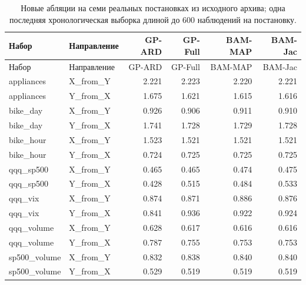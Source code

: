 \begin{longtable}{llrrrr}
\caption{Новые абляции на семи реальных постановках из исходного архива; одна последняя хронологическая выборка длиной до 600 наблюдений на постановку.}\label{tab:metric-real}\\
\toprule
Набор & Направление & GP-ARD & GP-Full & BAM-MAP & BAM-Jac \\
\midrule
\endfirsthead
\toprule
Набор & Направление & GP-ARD & GP-Full & BAM-MAP & BAM-Jac \\
\midrule
\endhead
appliances & X\_from\_Y & 2.221 & 2.223 & 2.220 & 2.221 \\
appliances & Y\_from\_X & 1.675 & 1.621 & 1.615 & 1.616 \\
bike\_day & X\_from\_Y & 0.926 & 0.906 & 0.911 & 0.910 \\
bike\_day & Y\_from\_X & 1.741 & 1.728 & 1.729 & 1.728 \\
bike\_hour & X\_from\_Y & 1.523 & 1.521 & 1.521 & 1.521 \\
bike\_hour & Y\_from\_X & 0.724 & 0.725 & 0.725 & 0.725 \\
qqq\_sp500 & X\_from\_Y & 0.465 & 0.465 & 0.474 & 0.475 \\
qqq\_sp500 & Y\_from\_X & 0.428 & 0.515 & 0.484 & 0.533 \\
qqq\_vix & X\_from\_Y & 0.874 & 0.871 & 0.886 & 0.876 \\
qqq\_vix & Y\_from\_X & 0.841 & 0.936 & 0.922 & 0.924 \\
qqq\_volume & X\_from\_Y & 0.628 & 0.617 & 0.616 & 0.616 \\
qqq\_volume & Y\_from\_X & 0.787 & 0.755 & 0.753 & 0.753 \\
sp500\_volume & X\_from\_Y & 0.832 & 0.838 & 0.840 & 0.840 \\
sp500\_volume & Y\_from\_X & 0.529 & 0.519 & 0.519 & 0.519 \\
\bottomrule
\end{longtable}
